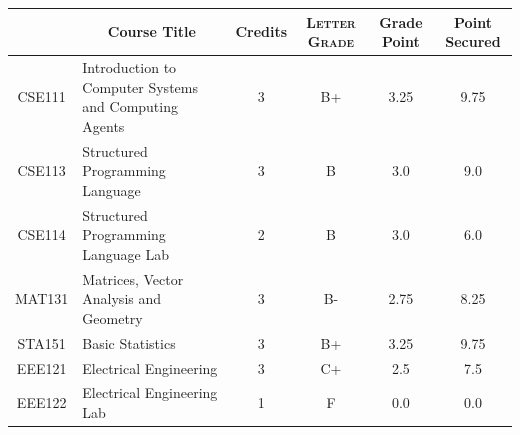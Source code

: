 \documentclass[11pt]{article}
\newcommand*{\numtwo}[1]{\pgfmathprintnumber[
                    fixed, precision=2, fixed zerofill=true]{#1}}
\begin{document}
                \begin{center}
                    \renewcommand{\arraystretch}{1.08}
                    
                \begin{tabular}{|c|l|c|>{\scshape}c|c|c|}
                \hline  \rule[-1ex]{0pt}{3.5ex} {\centering{\bf Course Code}} &  \multicolumn{1}{c|}{\textbf{Course Title}}  & {\bf Credits} & {\bf Letter Grade} & {\bf Grade Point} & {\bf Point Secured}  \\ 
                \hline   CSE111 &  Introduction to Computer Systems and Computing Agents		 & 3 & B+ & 3.25 & 9.75 \\ %
                \hline   CSE113 &  Structured Programming Language		 & 3 & B & 3.0 & 9.0 \\ %
                \hline   CSE114 &  Structured Programming Language Lab		 & 2 & B & 3.0 & 6.0 \\ %
                \hline   MAT131 &  Matrices, Vector Analysis and Geometry		 & 3 & B- & 2.75 & 8.25 \\ %
                \hline   STA151 &  Basic Statistics		 & 3 & B+ & 3.25 & 9.75 \\ %
                \hline   EEE121 &  Electrical Engineering		 & 3 & C+ & 2.5 & 7.5 \\ %
                \hline   EEE122 &  Electrical Engineering Lab		 & 1 & F & 0.0 & 0.0 \\ %

\hline                %
                \end{tabular}
                \end{center}
                \renewcommand{\arraystretch}{1.03}
\end{document}
